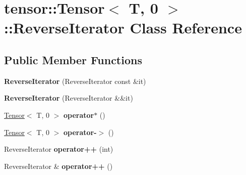 \hypertarget{classtensor_1_1Tensor_3_01T_00_010_01_4_1_1ReverseIterator}{}\section{tensor\+:\+:Tensor$<$ T, 0 $>$\+:\+:Reverse\+Iterator Class Reference}
\label{classtensor_1_1Tensor_3_01T_00_010_01_4_1_1ReverseIterator}
\subsection*{Public Member Functions}
\begin{DoxyCompactItemize}
\item 
{\bfseries Reverse\+Iterator} (Reverse\+Iterator const \&it)\hypertarget{classtensor_1_1Tensor_3_01T_00_010_01_4_1_1ReverseIterator_ad92b8355272e517fbcb1e00c7b96be99}{}\label{classtensor_1_1Tensor_3_01T_00_010_01_4_1_1ReverseIterator_ad92b8355272e517fbcb1e00c7b96be99}

\item 
{\bfseries Reverse\+Iterator} (Reverse\+Iterator \&\&it)\hypertarget{classtensor_1_1Tensor_3_01T_00_010_01_4_1_1ReverseIterator_a5fcecdf76deeacecb72d43ed8e31f442}{}\label{classtensor_1_1Tensor_3_01T_00_010_01_4_1_1ReverseIterator_a5fcecdf76deeacecb72d43ed8e31f442}

\item 
\hyperlink{classtensor_1_1Tensor}{Tensor}$<$ T, 0 $>$ {\bfseries operator$\ast$} ()\hypertarget{classtensor_1_1Tensor_3_01T_00_010_01_4_1_1ReverseIterator_a7df417e598be3b02f9794fd911fafb6c}{}\label{classtensor_1_1Tensor_3_01T_00_010_01_4_1_1ReverseIterator_a7df417e598be3b02f9794fd911fafb6c}

\item 
\hyperlink{classtensor_1_1Tensor}{Tensor}$<$ T, 0 $>$ {\bfseries operator-\/$>$} ()\hypertarget{classtensor_1_1Tensor_3_01T_00_010_01_4_1_1ReverseIterator_aea7dfb4545c4c39a82ae4b9d1ad74516}{}\label{classtensor_1_1Tensor_3_01T_00_010_01_4_1_1ReverseIterator_aea7dfb4545c4c39a82ae4b9d1ad74516}

\item 
Reverse\+Iterator {\bfseries operator++} (int)\hypertarget{classtensor_1_1Tensor_3_01T_00_010_01_4_1_1ReverseIterator_abc201d98d476750213889572e77fb1a1}{}\label{classtensor_1_1Tensor_3_01T_00_010_01_4_1_1ReverseIterator_abc201d98d476750213889572e77fb1a1}

\item 
Reverse\+Iterator \& {\bfseries operator++} ()\hypertarget{classtensor_1_1Tensor_3_01T_00_010_01_4_1_1ReverseIterator_a9cba6a8b2e925743d0e621d1a24945b4}{}\label{classtensor_1_1Tensor_3_01T_00_010_01_4_1_1ReverseIterator_a9cba6a8b2e925743d0e621d1a24945b4}


\end{DoxyCompactItemize}
